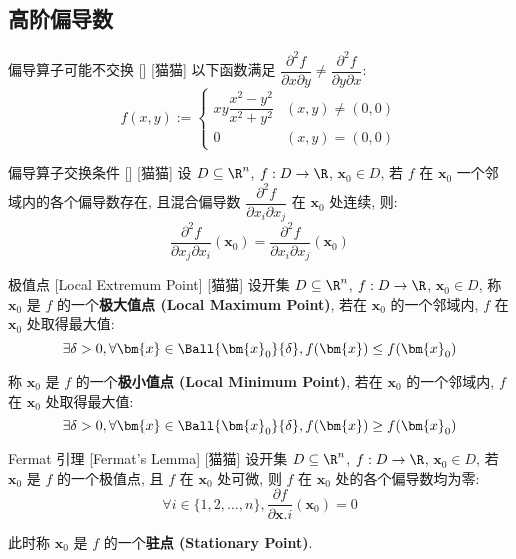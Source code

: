 \documentclass[UTF8]{ctexart}
\begin{document}
		\subsection{高阶偏导数}
			
			\begin{cxmp}
				[]
				{偏导算子可能不交换}
				[]
				[猫猫]
				以下函数满足 \(\dfrac{\partial^2 f}{\partial x\partial y}\neq\dfrac{\partial^2 f}{\partial y\partial x}\): 
				\[f(x,y):=
				\begin{cases}
					xy\dfrac{x^2-y^2}{x^2+y^2} & (x,y)\neq(0,0)\\
					0 & (x,y)=(0,0)
				\end{cases}\]
			\end{cxmp}
			
			\begin{thm}
				[]
				{偏导算子交换条件}
				[]
				[猫猫]
				设 \(D\subseteq\R^n\), \(f:D\to\R\), \(\bm{x}_0\in D\), 若 \(f\) 在 \(\bm{x}_0\) 一个邻域内的各个偏导数存在, 且混合偏导数 \(\dfrac{\partial^2 f}{\partial x_i\partial x_j}\) 在 \(\bm{x}_0\) 处连续, 则: 
				\[\dfrac{\partial^2 f}{\partial x_j\partial x_i}(\bm{x}_0)=\dfrac{\partial^2 f}{\partial x_i\partial x_j}(\bm{x}_0)\]
			\end{thm}
			
			\begin{dfn}
				[]
				{极值点}
				[Local Extremum Point]
				[猫猫]
				设开集 \(D\subseteq\R^n\), \(f:D\to\R\), \(\bm{x}_0\in D\), 称 \(\bm{x}_0\) 是 \(f\) 的一个\textbf{极大值点 (Local Maximum Point)}, 若在 \(\bm{x}_0\) 的一个邻域内, \(f\) 在 \(\bm{x}_0\) 处取得最大值:
				\[\exists\delta>0, \forall\bm{x}\in\Ball{\bm{x}_0}{\delta}, f(\bm{x})\leq f(\bm{x}_0)\]

				称 \(\bm{x}_0\) 是 \(f\) 的一个\textbf{极小值点 (Local Minimum Point)}, 若在 \(\bm{x}_0\) 的一个邻域内, \(f\) 在 \(\bm{x}_0\) 处取得最大值:
				\[\exists\delta>0, \forall\bm{x}\in\Ball{\bm{x}_0}{\delta}, f(\bm{x})\geq f(\bm{x}_0)\]
			\end{dfn}
			
			\begin{thm}
				[]
				{Fermat 引理}
				[Fermat's Lemma]
				[猫猫]
				设开集 \(D\subseteq\R^n\), \(f:D\to\R\), \(\bm{x}_0\in D\), 若 \(\bm{x}_0\) 是 \(f\) 的一个极值点, 且 \(f\) 在 \(\bm{x}_0\) 处可微, 则 \(f\) 在 \(\bm{x}_0\) 处的各个偏导数均为零: 
				\[\forall i\in\{1,2,\dots,n\}, \frac{\partial f}{\partial \bm{x}.i}(\bm{x}_0)=0\]

				此时称 \(\bm{x}_0\) 是 \(f\) 的一个\textbf{驻点 (Stationary Point)}. 
			\end{thm}
			
\end{document}
